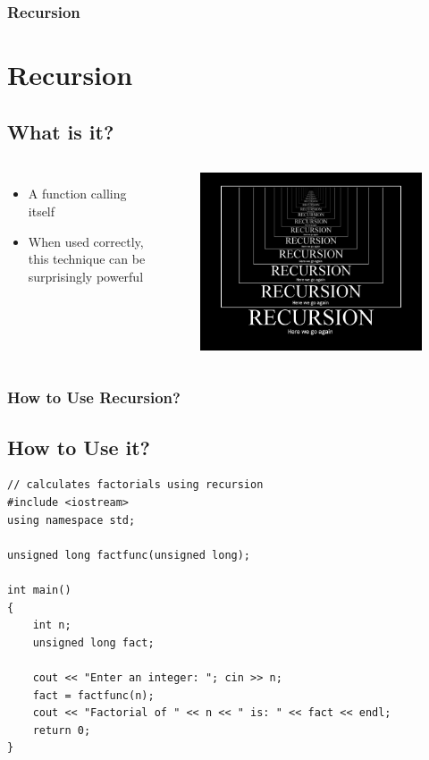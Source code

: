 \documentclass{beamer}
\begin{document}
\begin{frame}\frametitle{Recursion}
    \section{Recursion} %
    \label{sec:recursion}
    \subsection{What is it?} %
    \label{sub:what_is_it_}
    \begin{columns}
        \begin{itemize}
            \item A function calling itself
            \item When used correctly, this technique can be surprisingly powerful
        \end{itemize}
        \begin{figure}
            \centering
            \includegraphics[scale=0.2]{recursion}
        \end{figure}
    \end{columns}
\end{frame}

\begin{frame}[fragile]\frametitle{How to Use Recursion?}
    \subsection{How to Use it?} %
    \label{sub:how_to_use_it_}
    \lstset{style=mystyle}
\begin{lstlisting}
// calculates factorials using recursion
#include <iostream>
using namespace std;

unsigned long factfunc(unsigned long);

int main()
{
    int n;
    unsigned long fact;

    cout << "Enter an integer: "; cin >> n;
    fact = factfunc(n);
    cout << "Factorial of " << n << " is: " << fact << endl;
    return 0;
}
\end{lstlisting}
\end{frame}
\end{document}
